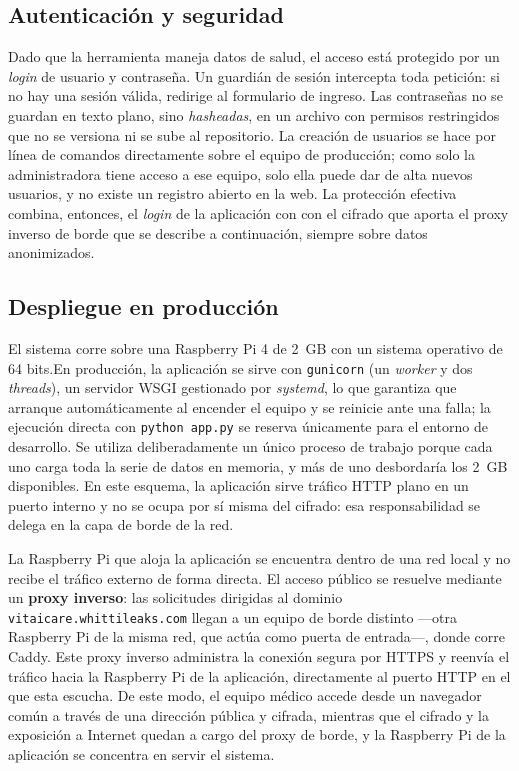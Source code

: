 \documentclass[12pt,a4paper]{article}
\begin{document}
    \subsection{Autenticación y seguridad}
    Dado que la herramienta maneja datos de salud, el acceso está protegido por un \textit{login} de usuario y contraseña. Un guardián de sesión intercepta toda petición: si no hay una sesión válida, redirige al formulario de ingreso. Las contraseñas no se guardan en texto plano, sino \textit{hasheadas}, en un archivo con permisos restringidos que no se versiona ni se sube al repositorio. La creación de usuarios se hace por línea de comandos directamente sobre el equipo de producción; como solo la administradora tiene acceso a ese equipo, solo ella puede dar de alta nuevos usuarios, y no existe un registro abierto en la web. La protección efectiva combina, entonces, el \textit{login} de la aplicación con con el cifrado que aporta el proxy inverso de borde que se describe a continuación, siempre sobre datos anonimizados.

    \subsection{Despliegue en producción}
    El sistema corre sobre una Raspberry Pi 4 de 2~GB con un sistema operativo de 64 bits.En producción, la aplicación se sirve con \texttt{gunicorn} (un \textit{worker} y dos \textit{threads}), un servidor WSGI gestionado por \textit{systemd}, lo que garantiza que arranque automáticamente al encender el equipo y se reinicie ante una falla; la ejecución directa con \texttt{python app.py} se reserva únicamente para el entorno de desarrollo. Se utiliza deliberadamente un único proceso de trabajo porque cada uno carga toda la serie de datos en memoria, y más de uno desbordaría los 2~GB disponibles. En este esquema, la aplicación sirve tráfico HTTP plano en un puerto interno y no se ocupa por sí misma del cifrado: esa responsabilidad se delega en la capa de borde de la red.

    La Raspberry Pi que aloja la aplicación se encuentra dentro de una red local y no recibe el tráfico externo de forma directa. El acceso público se resuelve mediante un \textbf{proxy inverso}: las solicitudes dirigidas al dominio \texttt{vitaicare.whittileaks.com} llegan a un equipo de borde distinto —otra Raspberry Pi de la misma red, que actúa como puerta de entrada—, donde corre Caddy. Este proxy inverso administra la conexión segura por HTTPS y reenvía el tráfico hacia la Raspberry Pi de la aplicación, directamente al puerto HTTP en el que esta escucha. De este modo, el equipo médico accede desde un navegador común a través de una dirección pública y cifrada, mientras que el cifrado y la exposición a Internet quedan a cargo del proxy de borde, y la Raspberry Pi de la aplicación se concentra en servir el sistema.
\end{document}
